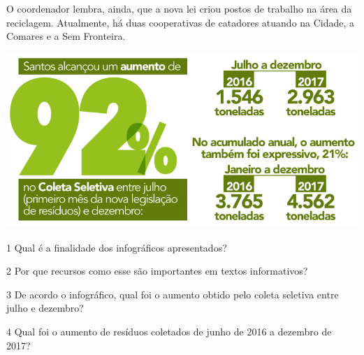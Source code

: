 \begin{conteudo}
\begin{conteudo}
\begin{conteudo}
\begin{conteudo}
\begin{conteudo}
\begin{myquote}
O coordenador lembra, ainda, que a nova lei criou postos de trabalho na
área da reciclagem. Atualmente, há duas cooperativas de catadores
atuando na Cidade, a Comares e a Sem Fronteira.

\begin{center}
\includegraphics[width=\textwidth]{media/image31.jpeg}
\end{center}

\end{myquote}

\vspace{1em}

\num{1} Qual é a finalidade dos infográficos apresentados?


\num{2} Por que recursos como esse são importantes em textos informativos?


\num{3} De acordo o infográfico, qual foi o aumento obtido
pelo coleta seletiva entre julho e dezembro?


\num{4} Qual foi o aumento de resíduos coletados de junho de 2016 a dezembro de 2017?



\end{conteudo}
\end{conteudo}
\end{conteudo}
\end{conteudo}
\end{conteudo}
